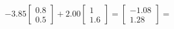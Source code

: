 \documentclass[preview]{standalone}
\begin{document}
\begin{align*}
-3.85 \begin{bmatrix} 0.8 \\ 0.5 \end{bmatrix} + 2.00 \begin{bmatrix} 1 \\ 1.6 \end{bmatrix} = \begin{bmatrix} -1.08 \\ 1.28 \end{bmatrix} =
\end{align*}
\end{document}
